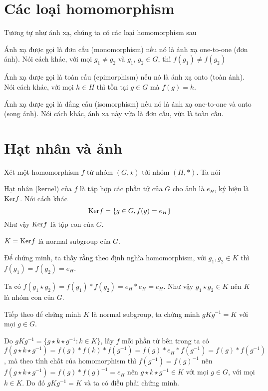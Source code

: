 \section{Các loại homomorphism}

Tương tự như ánh xạ, chúng ta có các loại homomorphism sau

\begin{definition}[Monomorphism]
    Ánh xạ được gọi là đơn cấu (monomorphism) nếu nó là ánh xạ one-to-one (đơn ánh).
    Nói cách khác, với mọi $g_1 \neq g_2$ và $g_1$, $g_2 \in G$, thì
    $f(g_1) \neq f(g_2)$
\end{definition}

\begin{definition}[Epimorphism]
    Ánh xạ được gọi là toàn cấu (epimorphism) nếu nó là ánh xạ onto (toàn ánh).
    Nói cách khác, với mọi $h \in H$ thì tồn tại $g \in G$ mà $f(g) = h$.
\end{definition}

\begin{definition}[Isomorphism]
    Ánh xạ được gọi là đẳng cấu (isomorphism) nếu nó là ánh xạ one-to-one 
    và onto (song ánh).
    Nói cách khác, ánh xạ này vừa là đơn cấu, vừa là toàn cấu.
\end{definition}

\section{Hạt nhân và ảnh}

Xét một homomorphism $f$ từ nhóm $(G, \star)$ tới nhóm $(H, *)$. Ta nói

\begin{definition}[Kernel]
    Hạt nhân (kernel) của $f$ là tập hợp các phần tử của $G$ cho ảnh là $e_H$, ký hiệu
    là $\text{Ker} f$. Nói cách khác
    \begin{equation}
        \text{Ker} f = \{ g \in G, f(g) = e_H \}
    \end{equation}
    Như vậy $\text{Ker} f$ là tập con của $G$.
\end{definition}

\begin{remark}
    $K = \text{Ker} f$ là normal subgroup của $G$.

    Để chứng minh, ta thấy rằng theo định nghĩa homomorphism,
    với $g_1, g_2 \in K$ thì $f(g_1) = f(g_2) = e_H$.
    
    Ta có $f(g_1 \star g_2) = f(g_1) * f(g_2) = e_H * e_H = e_H$. Như vậy
    $g_1 \star g_2 \in K$ nên $K$ là nhóm con của $G$.
    
    Tiếp theo để chứng minh $K$ là normal subgroup, ta chứng minh
    $g K g^{-1} = K$ với mọi $g \in G$.

    Do $g K g^{-1} = \{ g \star k \star g^{-1} : k \in K \}$, lấy $f$ mỗi phần 
    tử bên trong ta có 
    \[f(g \star k \star g^{-1}) = f(g) * f(k) * f(g^{-1}) = 
    f(g) * e_H * f(g^{-1}) = f(g) * f(g^{-1})\]
    , mà theo tính chất của homomorphism thì $f(g^{-1}) = f(g)^{-1}$ nên 
    $f(g \star k \star g^{-1}) = f(g) * f(g)^{-1} = e_H$ nên 
    $g \star k \star g^{-1} \in K$ với mọi
    $g \in G$, với mọi $k \in K$. Do đó $g K g^{-1} = K$ và ta có điều phải
    chứng minh.
\end{remark}

